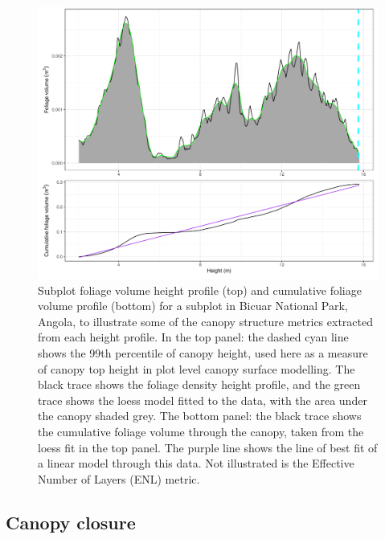 \documentclass[11pt,a4paper]{article}
\begin{document}
\begin{figure}
\centering
	\includegraphics[width=\linewidth]{height_profile_illus_all}
	\caption{Subplot foliage volume height profile (top) and cumulative foliage volume profile (bottom) for a subplot in Bicuar National Park, Angola, to illustrate some of the canopy structure metrics extracted from each height profile. In the top panel: the dashed cyan line shows the 99th percentile of canopy height, used here as a measure of canopy top height in plot level canopy surface modelling. The black trace shows the foliage density height profile, and the green trace shows the loess model fitted to the data, with the area under the canopy shaded grey. The bottom panel: the black trace shows the cumulative foliage volume through the canopy, taken from the loess fit in the top panel. The purple line shows the line of best fit of a linear model through this data. Not illustrated is the Effective Number of Layers (ENL) metric.}
	\label{height_profile_illus}
\end{figure}

\subsection{Canopy closure}
\end{document}
